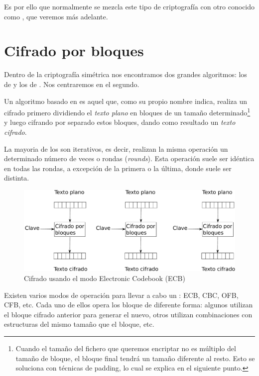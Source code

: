 Es por ello que normalmente se mezcla este tipo de criptografía con otro conocido como , que veremos más adelante.


\section{Cifrado por bloques}

Dentro de la criptografía simétrica nos encontramos dos grandes algoritmos: los de  y los de .
Nos centraremos en el segundo.

Un algoritmo basado en  es aquel que, como su propio nombre indica,
realiza un cifrado primero dividiendo el \emph{texto plano} en bloques de un tamaño determinado\footnote{Cuando el tamaño del fichero que queremos encriptar no es múltiplo del tamaño de bloque, el bloque final tendrá un tamaño diferente al resto. Esto se soluciona con técnicas de padding, lo cual se explica en el siguiente punto.}
y luego cifrando por separado estos bloques, dando como resultado un \emph{texto cifrado}.

La mayoria de los  son iterativos, es decir, realizan la misma operación un determinado número de veces o rondas (\emph{rounds}).
Esta operación suele ser idéntica en todas las rondas, a excepción de la primera o la última, donde suele ser distinta.

\begin{figure}[ht]
  \centering
  \includegraphics[scale=0.5]{Figures/ECB}
  \decoRule
  \caption[Electronic Codebook (ECB)]{Cifrado usando el modo Electronic Codebook (ECB)}
  \label{fig:ECB}
\end{figure}

Existen varios modos de operación para llevar a cabo un : ECB, CBC, OFB, CFB, etc.
Cada uno de ellos opera los bloque de diferente forma: algunos utilizan el bloque cifrado anterior para generar el nuevo,
otros utilizan combinaciones con estructuras del mismo tamaño que el bloque, etc. \emph{\parencite{Reference21}}

